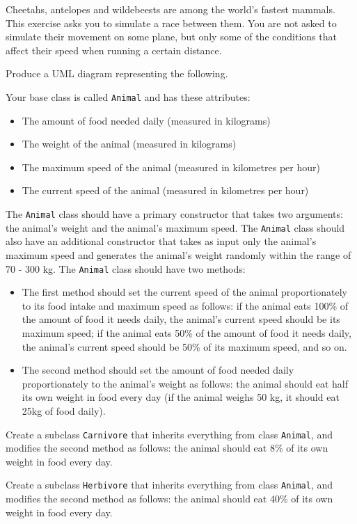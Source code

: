 Cheetahs, antelopes and wildebeests are among the world's fastest mammals. This exercise asks you to simulate a race between them. You are not asked to simulate their movement on some plane, but only some of the conditions that affect their speed when running a certain distance. 
  
  Produce a UML diagram representing the following.
  
  Your base class is called \texttt{Animal} and has these attributes: 
  \begin{itemize}
  \item The amount of food needed daily (measured in kilograms)
  \item The weight of the animal (measured in kilograms)
  \item The maximum speed of the animal (measured in kilometres per hour)
  \item The current speed of the animal (measured in kilometres per hour)
  \end{itemize}
  The \texttt{Animal} class should have a primary constructor that takes two arguments: the animal's weight and the animal's maximum speed. The \texttt{Animal} class should also have an additional constructor that takes as input only the animal's maximum speed and generates the animal's weight randomly within the range of 70 - 300 kg. The \texttt{Animal} class should have two methods:
  \begin{itemize}
  \item The first method should set the current speed of the animal proportionately to its food intake and maximum speed as follows: if the animal eats 100\% of the amount of food it needs daily, the animal's current speed should be its maximum speed; if the animal eats 50\% of the amount of food it needs daily, the animal's current speed should be 50\% of its maximum speed, and so on.
  \item The second method should set the amount of food needed daily proportionately to the animal's weight as follows: the animal should eat half its own weight in food every day (if the animal weighs 50 kg, it should eat 25kg of food daily).
  \end{itemize}
  
  
  Create a subclass \texttt{Carnivore} that inherits everything from class \texttt{Animal}, and modifies the second method as follows: the animal should eat 8\% of its own weight in food every day.
  
  Create a subclass \texttt{Herbivore} that inherits everything from class \texttt{Animal}, and modifies the second method as follows: the animal should eat 40\% of its own weight in food every day.
  
